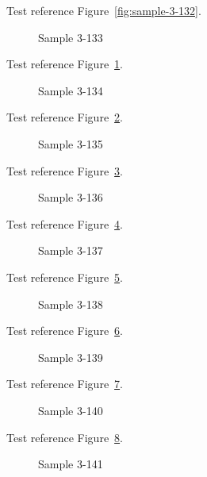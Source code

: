 Test reference Figure~\ref{fig:sample-3-132}.

\begin{figure}[tbhp]
\caption{Sample 3-133}
\label{fig:sample-3-133}
\end{figure}

Test reference Figure~\ref{fig:sample-3-133}.

\begin{figure}[tbhp]
\caption{Sample 3-134}
\label{fig:sample-3-134}
\end{figure}

Test reference Figure~\ref{fig:sample-3-134}.

\begin{figure}[tbhp]
\caption{Sample 3-135}
\label{fig:sample-3-135}
\end{figure}

Test reference Figure~\ref{fig:sample-3-135}.

\begin{figure}[tbhp]
\caption{Sample 3-136}
\label{fig:sample-3-136}
\end{figure}

Test reference Figure~\ref{fig:sample-3-136}.

\begin{figure}[tbhp]
\caption{Sample 3-137}
\label{fig:sample-3-137}
\end{figure}

Test reference Figure~\ref{fig:sample-3-137}.

\begin{figure}[tbhp]
\caption{Sample 3-138}
\label{fig:sample-3-138}
\end{figure}

Test reference Figure~\ref{fig:sample-3-138}.

\begin{figure}[tbhp]
\caption{Sample 3-139}
\label{fig:sample-3-139}
\end{figure}

Test reference Figure~\ref{fig:sample-3-139}.

\begin{figure}[tbhp]
\caption{Sample 3-140}
\label{fig:sample-3-140}
\end{figure}

Test reference Figure~\ref{fig:sample-3-140}.

\begin{figure}[tbhp]
\caption{Sample 3-141}
\label{fig:sample-3-141}
\end{figure}

